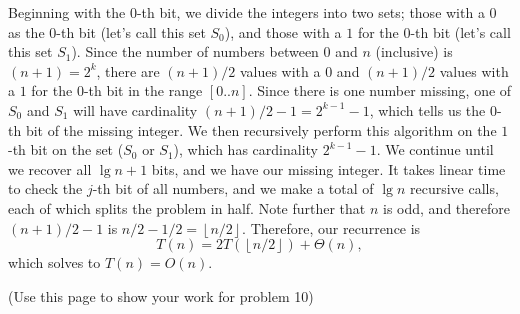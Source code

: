 \documentclass[letterpaper,11pt]{article}
\begin{document}
\begin{enumerate}
Beginning with the $0$-th bit, we divide the integers into two sets; those with a $0$ as the $0$-th bit (let's call this set $S_0$), and those with a $1$ for the $0$-th bit (let's call this set $S_1$). Since the number of numbers between $0$ and $n$ (inclusive) is $(n+1) = 2^k$, there are $(n+1)/2$ values with a $0$ and $(n+1)/2$ values with a $1$ for the $0$-th bit in the range $[0..n]$. Since there is one number missing, one of $S_0$ and $S_1$ will have cardinality $(n+1)/2-1=2^{k-1}-1$, which tells us the $0$-th bit of the missing integer. We then recursively perform this algorithm on the $1$-th bit on the set ($S_{0}$ or $S_1$), which has cardinality $2^{k-1}-1$. We continue until we recover all $\lg n+1$ bits, and we have our missing integer. It takes linear time to check the $j$-th bit of all numbers, and we make a total of $\lg n$ recursive calls, each of which splits the problem in half. Note further that $n$ is odd, and therefore $(n+1)/2 -1$ is $n/2 - 1/2 = \left\lfloor n/2 \right\rfloor$. Therefore, our recurrence is
\[T(n) = 2T(\left\lfloor n/2\right\rfloor) + \Theta(n),\]
which solves to $T(n) = O(n).$\\



\end{enumerate}

\newpage
(Use this page to show your work for problem 10)
\end{document}
